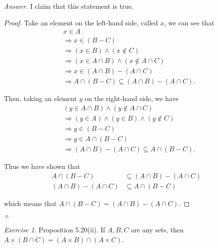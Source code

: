 \documentclass[12pt,oneside]{amsart}
\theoremstyle{remark}
\newtheorem{exer}{Exercise}
\newenvironment{answer}{\bigskip\noindent\emph{Answer.}}{\hfill$\diamond$\newline}
\begin{document}
\begin{answer}
I claim that this statement is true.

\begin{proof}
Take an element on the left-hand side, called $x$, we can see that
\begin{align*}
&x \in A \tag{because $x \in A \cap (B - C)$} \\
&\Rightarrow  x \in (B - C) \tag{definition of $\cap$} \\
&\Rightarrow (x \in B) \wedge (x \notin C) \tag{definition of $-$} \\
&\Rightarrow (x \in A \cap B) \wedge (x \notin A \cap C) \\
&\Rightarrow x \in (A \cap B) - (A \cap C) \\
&\Rightarrow A \cap (B - C) \subseteq (A \cap B) - (A \cap C).
\end{align*}

Then, taking an element $y$ on the right-hand side, we have
\begin{align*}
&(y \in A \cap B) \wedge (y \notin A \cap C) \tag{definition of $-$} \\
&\Rightarrow (y \in A) \wedge (y \in B) \wedge (y \notin C) \tag{definition of $\cap$} \\
&\Rightarrow y \in (B - C) \\
&\Rightarrow y \in A \cap (B - C) \\
&\Rightarrow (A \cap B) - (A \cap C) \subseteq A \cap (B - C).
\end{align*}

Thus we have shown that
\begin{align*}
A \cap (B - C) &\subseteq (A \cap B) - (A \cap C) \\
(A \cap B) - (A \cap C) &\subseteq A \cap (B - C)
\end{align*}

which means that $A \cap (B - C) = (A \cap B) - (A \cap C)$.
\end{proof}
\end{answer}

%
%
%
%
\newpage
\begin{exer}
Proposition 5.20(ii). If $A, B, C$ are any sets, then $A \times (B \cap C) = (A \times B) \cap (A \times C)$.
\end{exer}
\end{document}
